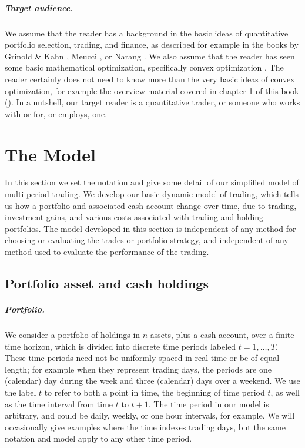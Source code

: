 \documentclass[openany]{now}
\begin{document}
\paragraph{Target audience.}
We assume that the reader has a background in the basic ideas of
quantitative portfolio selection, trading, and finance, as described for
example in the books by
Grinold \& Kahn \cite{grinold1999active}, Meucci \cite{meucci2005risk}, or Narang \cite{narang2013inside}.
We also assume that the reader has seen some basic
mathematical optimization, specifically convex optimization \cite{boyd2004convex}.
The reader certainly does not need to know more than the very basic ideas
of convex optimization, for example the overview material covered in chapter 1 of
this book (\cite{boyd2004convex}).
In a nutshell, our target reader is a quantitative trader,
or someone who works with or for, or employs, one.

\chapter{The Model}\label{s-model}
In this section we set the notation and give some detail of
our simplified model of multi-period trading.
We develop our basic dynamic model of trading, which tells us
how a portfolio and associated cash account change over time,
due to trading, investment gains, and various costs associated with
trading and holding portfolios.
The model developed in this section
is independent of any method for choosing or evaluating the
trades or portfolio strategy, and independent of any method used to
evaluate the performance of the trading.

\section{Portfolio asset and cash holdings}
\paragraph{Portfolio.}
We consider a portfolio of holdings in $n$ assets,
plus a cash account, over a finite time horizon, which is
divided into discrete time periods labeled $t=1,\ldots,T$.
These time periods need not be
uniformly spaced in real time or be of equal length; for example when they
represent trading days, the periods are one (calendar) day during
the week and three (calendar) days over a weekend.
We use the label $t$ to refer to both
a point in time, the beginning of time period $t$,
as well as the time interval from time $t$ to $t+1$.
The time period in our model is arbitrary, and could be daily, weekly,
or one hour intervals, for example.  We will occasionally give examples
where the time indexes trading days, but the same notation and model
apply to any other time period.
\end{document}
